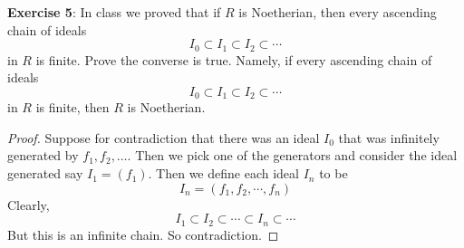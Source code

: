\documentclass{article}
\begin{document}
\textbf{Exercise 5}: In class we proved that if $R$ is Noetherian, then every ascending chain of ideals
    \begin{equation*}
        I_{0} \subset I_{1} \subset I_{2} \subset \cdots
    \end{equation*}
in $R$ is finite. Prove the converse is true. Namely, if every ascending chain of ideals
    \begin{equation*}
        I_{0} \subset I_{1} \subset I_{2} \subset \cdots
    \end{equation*}
in $R$ is finite, then $R$ is Noetherian.
    \begin{proof}
        Suppose for contradiction that there was an ideal $I_{0}$ that was infinitely generated by $f_{1}, f_{2}, \ldots$. Then we pick one of the generators and consider the ideal generated say $I_{1} = (f_{1})$. Then we define each ideal $I_{n}$ to be 
            \begin{equation*}
                I_{n} = (f_{1}, f_{2}, \cdots, f_{n})
            \end{equation*}
        Clearly, 
            \begin{equation*}
                I_{1} \subset I_{2} \subset  \cdots \subset I_{n} \subset \cdots
            \end{equation*}
        But this is an infinite chain. So contradiction.
    \end{proof}
\end{document}
